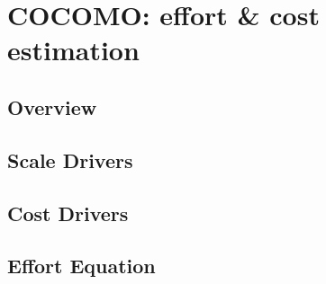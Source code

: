 \section{COCOMO: effort \& cost estimation}
\subsection{Overview} %
\label{sub:cocomo_overview}

\subsection{Scale Drivers} %
\label{sub:scale_drivers}

\subsection{Cost Drivers} %
\label{sub:cost_drivers}

\subsection{Effort Equation} %
\label{sub:effort_equation}